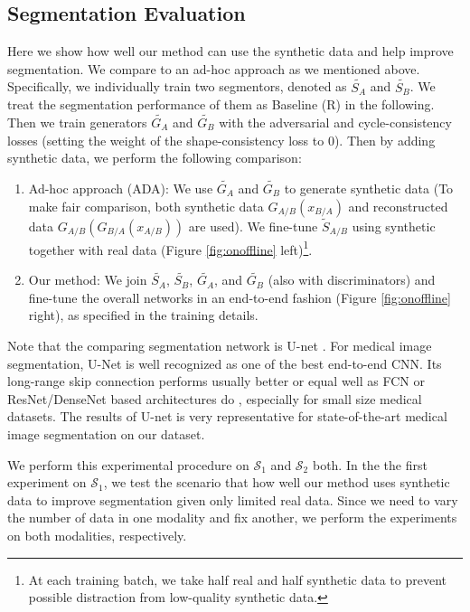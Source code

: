 \documentclass[10pt,twocolumn,letterpaper]{article}
\begin{document}
\subsection{Segmentation Evaluation} 
Here we show how well our method can use the synthetic data and help improve segmentation. We compare to an ad-hoc approach as we mentioned above.  
Specifically, we individually train two segmentors, denoted as $\tilde{S_A}$ and $\tilde{S_B}$. We treat the segmentation performance of them as Baseline (R) in the following. Then we train generators $\tilde{G_A}$ and $\tilde{G_B}$  with the adversarial and cycle-consistency losses (setting the weight of the shape-consistency loss to 0). Then by adding synthetic data, we perform the following comparison:

\begin{enumerate}[topsep=0pt]
	\item Ad-hoc approach (ADA): We use $\tilde{G_A}$ and $\tilde{G_B}$ to generate synthetic data (To make fair comparison, both synthetic data  $G_{A/B}(x_{B/A})$ and reconstructed data $G_{A/B}(G_{B/A}(x_{A/B}))$ are used). We fine-tune $\tilde{S}_{A/B}$ using synthetic together with real data (Figure \ref{fig:onoffline} left)\footnote{At each training batch, we take half real and half synthetic data to prevent possible distraction from low-quality synthetic data.}. 
	\item Our method: We join $\tilde{S_A}$,  $\tilde{S_B}$, $\tilde{G_A}$, and $\tilde{G_B}$ (also with discriminators) and fine-tune the overall networks in an end-to-end fashion (Figure \ref{fig:onoffline} right), as specified in the training details. 
\end{enumerate}
Note that the comparing segmentation network is U-net \cite{ronneberger2015u}. For medical image segmentation, U-Net is well recognized as one of the best end-to-end CNN. Its long-range skip connection performs usually better or equal well as FCN or ResNet/DenseNet based architectures do \cite{drozdzal2016importance}, especially for small size medical datasets. The results of U-net is very representative for state-of-the-art medical image segmentation on our dataset. 

We perform this experimental procedure on $\mathcal{S}_1$ and $\mathcal{S}_2$ both.
In the the first experiment on $\mathcal{S}_1$,
we test the scenario that how well our method uses synthetic data to improve segmentation given only limited real data. Since we need to vary the number of data in one modality and fix another, we perform the experiments on both modalities, respectively. 
\end{document}
